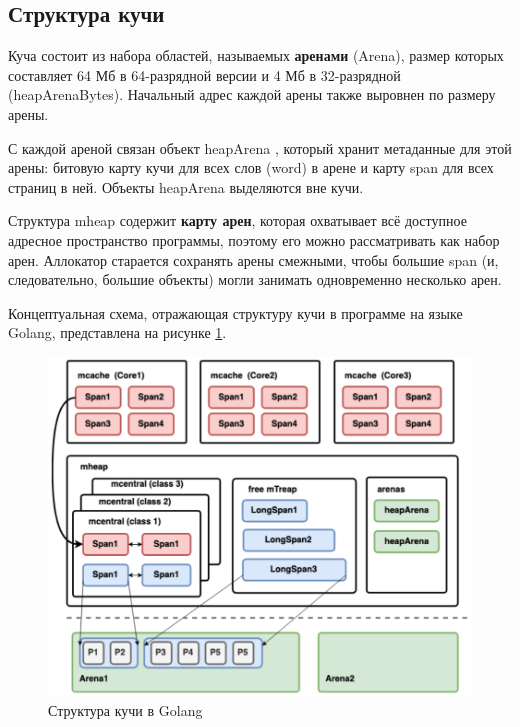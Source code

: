 \subsection{Структура кучи}

Куча состоит из набора областей, называемых \textbf{аренами} (Arena), размер которых составляет 64 Мб в 64-разрядной версии и 4 Мб в 32-разрядной (heapArenaBytes). Начальный адрес каждой арены также выровнен по размеру арены. \cite{golang_malloc}

С каждой ареной связан объект heapArena \cite{golang_mheap}, который хранит метаданные для этой арены: битовую карту кучи для всех слов (word) в арене и карту span для всех страниц в ней. Объекты heapArena выделяются вне кучи. \cite{golang_malloc}

Структура mheap содержит \textbf{карту арен}, которая охватывает всё доступное адресное пространство программы, поэтому его можно рассматривать как набор арен. Аллокатор старается сохранять арены смежными, чтобы большие span (и, следовательно, большие объекты) могли занимать одновременно несколько арен. \cite{golang_malloc}

Концептуальная схема, отражающая структуру кучи в программе на языке Golang, представлена на рисунке \ref{fig:golang_heap}.

\begin{figure}[H]
	\centering
	\includegraphics[width=\textwidth]{assets/golang-heap.png}
	\caption{Структура кучи в Golang}
	\label{fig:golang_heap}
\end{figure}



